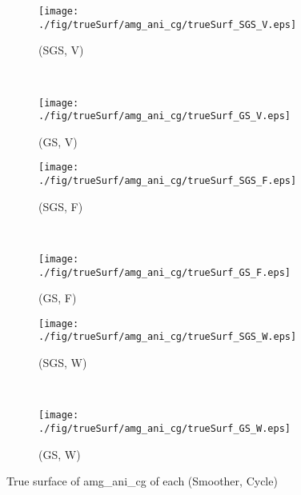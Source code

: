 \begin{figure}
  \centering
  \begin{subfigure}[h]{0.45\textwidth}
    \texttt{[image: ./fig/trueSurf/amg\_ani\_cg/trueSurf\_SGS\_V.eps]}
    \caption{(SGS, V)}
  \end{subfigure}
  ~
  \begin{subfigure}[h]{0.45\textwidth}
    \texttt{[image: ./fig/trueSurf/amg\_ani\_cg/trueSurf\_GS\_V.eps]}
    \caption{(GS, V)}
  \end{subfigure}
  
  \begin{subfigure}[h]{0.45\textwidth}
    \texttt{[image: ./fig/trueSurf/amg\_ani\_cg/trueSurf\_SGS\_F.eps]}
    \caption{(SGS, F)}
  \end{subfigure}
  ~
  \begin{subfigure}[h]{0.45\textwidth}
    \texttt{[image: ./fig/trueSurf/amg\_ani\_cg/trueSurf\_GS\_F.eps]}
    \caption{(GS, F)}
  \end{subfigure}
  
  \begin{subfigure}[h]{0.45\textwidth}
    \texttt{[image: ./fig/trueSurf/amg\_ani\_cg/trueSurf\_SGS\_W.eps]}
    \caption{(SGS, W)}
  \end{subfigure}
  ~
  \begin{subfigure}[h]{0.45\textwidth}
    \texttt{[image: ./fig/trueSurf/amg\_ani\_cg/trueSurf\_GS\_W.eps]}
    \caption{(GS, W)}
  \end{subfigure}
  \caption{True surface of amg\_ani\_cg of each (Smoother, Cycle)}\label{fig:trueSurf_amg_ani_cg}
\end{figure}

